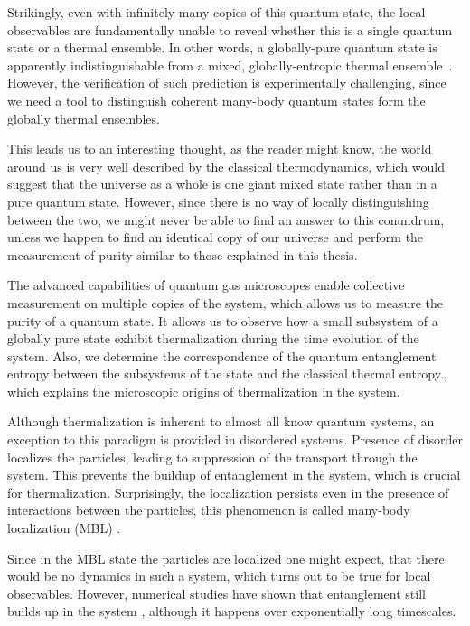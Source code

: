 Strikingly, even with infinitely many copies of this quantum state, the local observables are fundamentally unable to reveal whether this is a single quantum state or a thermal ensemble. In other words, a globally-pure quantum state is apparently indistinguishable from a mixed, globally-entropic thermal ensemble~\cite{Shankar1985, Deutsch1991, SrendickiETH, Olshanii2008}. However, the verification of such prediction is experimentally challenging, since we need a tool to distinguish coherent many-body quantum states form the globally thermal ensembles.

This leads us to an interesting thought, as the reader might know, the world around us is very well described by the classical thermodynamics, which would suggest that the universe as a whole is one giant mixed state rather than in a pure quantum state. However, since there is no way of locally distinguishing between the two, we might never be able to find an answer to this conundrum, unless we happen to find an identical copy of our universe and perform the measurement of purity similar to those explained in this thesis. 

The advanced capabilities of quantum gas microscopes enable collective measurement on multiple copies of the system, which allows us to measure the purity of a quantum state. It allows us to observe how a small subsystem of a globally pure state exhibit thermalization during the time evolution of the system. Also, we determine the correspondence of the quantum entanglement entropy between the subsystems of the state and the classical thermal entropy\cite{Rigol2012, Deutsch2013}., which explains the microscopic origins of thermalization in the system.

Although thermalization is inherent to almost all know quantum systems, an exception to this paradigm is provided in disordered systems. Presence of disorder localizes the particles\cite{ Anderson1958}, leading to suppression of the transport through the system. This prevents the buildup of entanglement in the system, which is crucial for thermalization. Surprisingly, the localization persists even in the presence of interactions between the particles, this phenomenon is called many-body localization (MBL) \cite{ Anderson1958, Gornyi2005, Basko2006, Oganesyan2007}.

Since in the MBL state the particles are localized one might expect, that there would be no dynamics in such a system, which turns out to be true for local observables. However, numerical studies have shown that entanglement still builds up in the system \cite{Znidaric2008, Bardarson2012}, although it happens over exponentially long timescales. 

